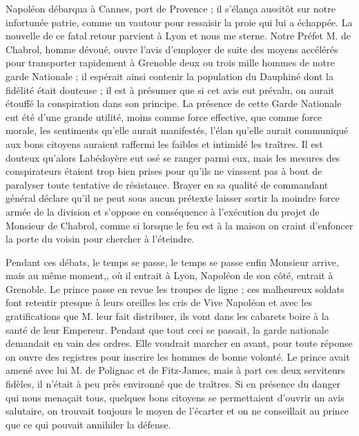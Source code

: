 \documentclass[11pt,a4paper]{report}
\begin{document}
Napoléon débarqua à Cannes, port de Provence ; il s'élança aussitôt sur notre infortunée patrie, comme un vautour pour ressaisir la proie qui lui a échappée. La nouvelle de ce fatal retour parvient à Lyon et nous me sterne. Notre Préfet M. de Chabrol, homme dévoué, ouvre l'avis d'employer de suite des moyens accélérés pour transporter rapidement à Grenoble deux ou trois mille hommes de notre garde Nationale ; il espérait ainsi contenir la population du Dauphiné dont la fidélité était douteuse ; il est à présumer que si cet avis eut prévalu, on aurait étouffé la conspiration dans son principe. La présence de cette Garde Nationale eut été d'une grande utilité, moins comme force effective, que comme force morale, les sentiments qu'elle aurait manifestés, l'élan qu'elle aurait communiqué aux bons citoyens auraient raffermi les faibles et intimidé les traîtres. Il est douteux qu'alors Labédoyère eut osé se ranger parmi eux, mais les mesures des conspirateurs étaient trop bien prises pour qu'ils ne vinssent pas à bout de paralyser toute tentative de résistance. Brayer en sa qualité de commandant général déclare qu'il ne peut sous aucun prétexte laisser sortir la moindre force armée de la division et s'oppose en conséquence à l'exécution du projet de Monsieur de Chabrol, comme si lorsque le feu est à la maison on craint d'enfoncer la porte du voisin pour chercher à l'éteindre.

Pendant ces débats, le temps se passe, le temps se passe enfin Monsieur arrive, mais au même moment,, où il entrait à Lyon, Napoléon de son côté, entrait à Grenoble. Le prince passe en revue les troupes de ligne ; ces malheureux soldats font retentir presque à leurs oreilles les cris de Vive Napoléon et avec les gratifications que M. leur fait distribuer, ils vont dans les cabarets boire à la santé de leur Empereur. Pendant que tout ceci se passait, la garde nationale demandait en vain des ordres. Elle voudrait marcher en avant, pour toute réponse on ouvre des registres pour inscrire les hommes de bonne volonté. Le prince avait amené avec lui M. de Polignac et de Fitz-James, mais à part ces deux serviteurs fidèles, il n'était à peu près environné que de traîtres. Si en présence du danger qui nous menaçait tous, quelques bons citoyens se permettaient d'ouvrir un avis salutaire, on trouvait toujours le moyen de l'écarter et on ne conseillait au prince que ce qui pouvait annihiler la défense.
\end{document}
